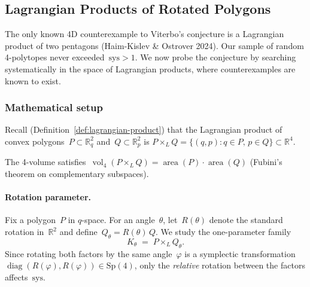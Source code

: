 %
%
%

\subsection{Lagrangian Products of Rotated Polygons}
\label{sec:lagrangian-products}

The only known 4D counterexample to Viterbo's conjecture is a Lagrangian
product of two pentagons (Haim-Kislev \& Ostrover 2024).
Our sample of random 4-polytopes never exceeded~$\mathrm{sys} > 1$. 
We now probe the conjecture by searching systematically in the space of Lagrangian products, where counterexamples are known to exist.

\subsubsection*{Mathematical setup}

Recall (Definition~\ref{def:lagrangian-product}) that the Lagrangian product
of convex polygons~$P \subset \mathbb{R}^2_q$ and~$Q \subset \mathbb{R}^2_p$
is $P \times_L Q = \{(q,p) : q \in P,\, p \in Q\} \subset \mathbb{R}^4$.

The 4-volume satisfies~$\operatorname{vol}_4(P \times_L Q)
= \operatorname{area}(P) \cdot \operatorname{area}(Q)$ (Fubini's theorem on
complementary subspaces).

\paragraph{Rotation parameter.}
Fix a polygon~$P$ in $q$-space. For an angle~$\theta$, let~$R(\theta)$ denote
the standard rotation in~$\mathbb{R}^2$ and
define~$Q_\theta = R(\theta)\,Q$. We study the one-parameter family
\[
  K_\theta \;=\; P \times_L Q_\theta.
\]
Since rotating both factors by the same angle~$\varphi$ is a symplectic
transformation~$\operatorname{diag}(R(\varphi), R(\varphi)) \in \mathrm{Sp}(4)$,
only the \emph{relative} rotation between the factors affects~$\mathrm{sys}$.


